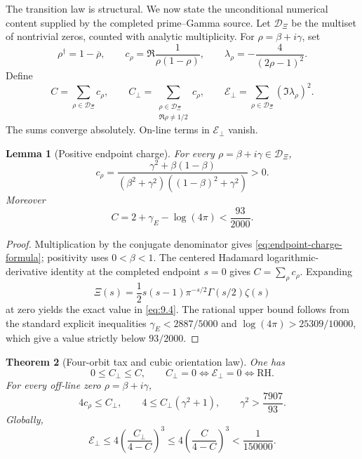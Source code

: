\documentclass[11pt]{article}
\newtheorem{theorem}{Theorem}[section]
\newtheorem{lemma}[theorem]{Lemma}
\theoremstyle{definition}
\theoremstyle{remark}
\begin{document}
The transition law is structural.  We now state the unconditional numerical content supplied by
the completed prime--Gamma source.  Let \(\mathcal D_\Xi\) be the multiset of nontrivial zeros,
counted with analytic multiplicity.  For \(\rho=\beta+i\gamma\), set
\[
 \rho^\dagger=1-\overline\rho,\qquad
 c_\rho=\Re\frac1{\rho(1-\rho)},\qquad
 \lambda_\rho=-\frac4{(2\rho-1)^2}.
 \tag{9.1}
\]
Define
\[
 C=\sum_{\rho\in\mathcal D_\Xi}c_\rho,\qquad
 C_\perp=\sum_{\substack{\rho\in\mathcal D_\Xi\\\Re\rho\ne1/2}}c_\rho,
 \qquad
 \mathcal E_\perp=\sum_{\rho\in\mathcal D_\Xi}(\Im\lambda_\rho)^2.
 \tag{9.2}
\]
The sums converge absolutely.  On-line terms in \(\mathcal E_\perp\) vanish.

\begin{lemma}[Positive endpoint charge]\label{lem:endpoint-charge}
For every \(\rho=\beta+i\gamma\in\mathcal D_\Xi\),
\[
 c_\rho=
 \frac{\gamma^2+\beta(1-\beta)}
 {(\beta^2+\gamma^2)((1-\beta)^2+\gamma^2)}>0.
 \label{eq:endpoint-charge-formula}
 \tag{9.3}
\]
Moreover
\[
 C=2+\gamma_{\!E}-\log(4\pi)
 <\frac{93}{2000}.
 \tag{9.4}
\]
\end{lemma}

\begin{proof}
Multiplication by the conjugate denominator gives \eqref{eq:endpoint-charge-formula}; positivity uses
\(0<\beta<1\).  The centered Hadamard logarithmic-derivative identity at the completed endpoint
\(s=0\) gives \(C=\sum_\rho c_\rho\).  Expanding
\[
 \Xi(s)=\frac12s(s-1)\pi^{-s/2}\Gamma(s/2)\zeta(s)
 \tag{9.5}
\]
at zero yields the exact value in \eqref{eq:9.4}.  The rational upper bound follows from the
standard explicit inequalities
\(\gamma_{\!E}<2887/5000\) and
\(\log(4\pi)>25309/10000\), which give a value strictly below \(93/2000\).
\end{proof}

\begin{theorem}[Four-orbit tax and cubic orientation law]
\label{thm:orientation-budget}
One has
\[
 0\leq C_\perp\leq C,\qquad
 C_\perp=0\Longleftrightarrow\mathcal E_\perp=0
 \Longleftrightarrow\mathrm{RH}.
 \label{eq:orientation-zero}
 \tag{9.6}
\]
For every off-line zero \(\rho=\beta+i\gamma\),
\[
 4c_\rho\leq C_\perp,\qquad
 4\leq C_\perp(\gamma^2+1),\qquad
 \gamma^2>\frac{7907}{93}.
 \label{eq:height-gap}
 \tag{9.7}
\]
Globally,
\begin{equation}
 \mathcal E_\perp
 \leq4\left(\frac{C_\perp}{4-C}\right)^3
 \leq4\left(\frac{C}{4-C}\right)^3
 <\frac1{150000}.
 \label{eq:orientation-cubic}
\end{equation}
\end{theorem}
\end{document}
